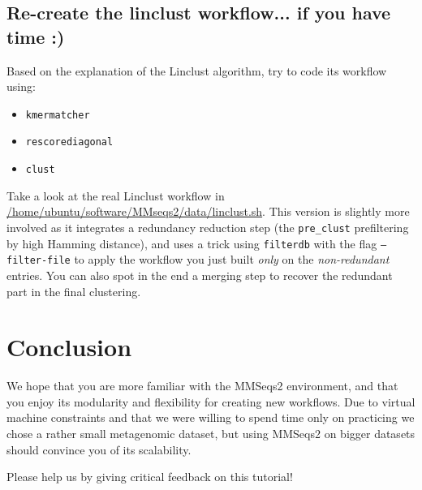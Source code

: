 \documentclass{scrartcl}
\begin{document}
\subsection{Re-create the linclust workflow... if you have time :)}

Based on the explanation of the Linclust algorithm, try to code its workflow using:
\begin{itemize}
    \item \texttt{kmermatcher}
    \item \texttt{rescorediagonal}
    \item \texttt{clust}
\end{itemize}

Take a look at the real Linclust workflow in \url{/home/ubuntu/software/MMseqs2/data/linclust.sh}. This version is slightly more involved as it integrates a redundancy reduction step (the \texttt{pre\_clust} prefiltering by high Hamming distance), and uses a trick using \texttt{filterdb} with the flag  \texttt{--filter-file} to apply the workflow you just built \textit{only} on the \textit{non-redundant} entries. You can also spot in the end a merging step to recover the redundant part in the final clustering.


\section{Conclusion}

We hope that you are more familiar with the MMSeqs2 environment, and that you enjoy its modularity and flexibility for creating new workflows. Due to virtual machine constraints and that we were willing to spend time only on practicing we chose a rather small metagenomic dataset, but using MMSeqs2 on bigger datasets should convince you of its scalability.

Please help us by giving critical feedback on this tutorial!




\end{document}
